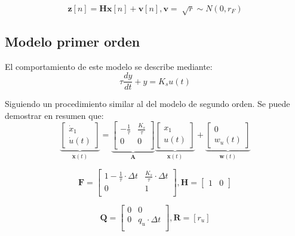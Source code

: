 \documentclass[conference]{IEEEtran}
\begin{document}
\[
\textbf{z}[n] = \textbf{H} \textbf{x}[n] + \textbf{v}[n] ,
\mathbf{v} = \sqrt[]{r} \sim {N} {(0,r_{F​})}
\]


\subsection{Modelo primer orden}

El comportamiento de este modelo se describe mediante:
\[
\tau \frac{dy}{dt} + y = K_s u(t)
\]

Siguiendo un procedimiento similar al del modelo de segundo orden. Se puede demostrar en resumen que:\\

\begin{equation*}
	\underbrace{
		\begin{bmatrix}
			\dot{x}_1 \\
			\dot{u}(t)
		\end{bmatrix}
	}_{\mathbf{\dot{x}}(t)}
	=
	\underbrace{\begin{bmatrix}
			-\frac{1}{\tau}           & \frac{K_s}{\tau}                 \\
			0 & 0   \\
	\end{bmatrix}}_{\mathbf{A}}
	\underbrace{\begin{bmatrix}
			x_1 \\
			u(t) 
	\end{bmatrix}}_{\mathbf{x}(t)}	
	+
	\underbrace{
		\begin{bmatrix}
			0 \\
			w_{u}(t)
		\end{bmatrix}
	}_{\mathbf{w}(t)}
\end{equation*}

\[
	\mathbf{F} = \begin{bmatrix}
		1 -\frac{1}{\tau} \cdot \Delta t          & \frac{K_s}{\tau} \cdot \Delta t               \\
		0 & 1 \\
	\end{bmatrix},
	\mathbf{H} =
	\begin{bmatrix}
		1 & 0
	\end{bmatrix}
\]

\[
\mathbf{Q} = \begin{bmatrix}
	0 & 0  \\
	0 & q_u \cdot \Delta t \\
\end{bmatrix}, 
\mathbf{R} = [r_u]
\]
\end{document}
